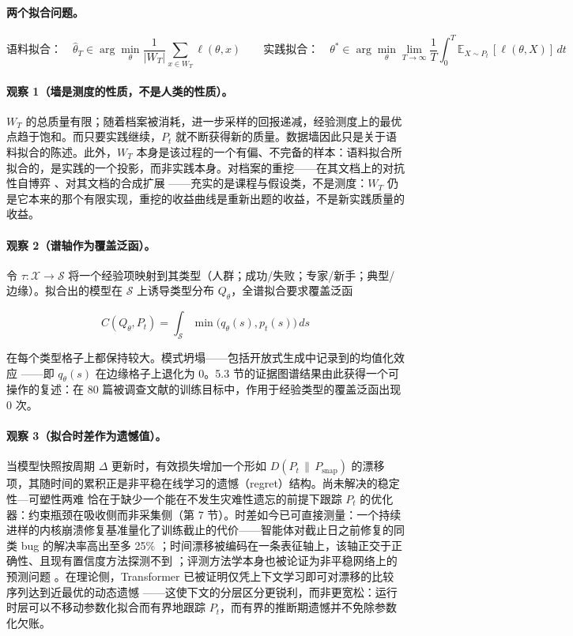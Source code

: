 \documentclass[10pt,fontset=fandol]{ctexart}
\begin{document}
\paragraph{两个拟合问题。}

\[\textbf{语料拟合：}\quad \hat{\theta}_T \in \arg\min_\theta \frac{1}{|W_T|}\sum_{x \in W_T} \ell(\theta, x) \qquad \textbf{实践拟合：}\quad \theta^* \in \arg\min_\theta \lim_{T\to\infty} \frac{1}{T}\int_0^T \mathbb{E}_{X \sim P_t}\,[\ell(\theta, X)]\, dt\]

\paragraph{观察 1（墙是测度的性质，不是人类的性质）。} $W_T$ 的总质量有限；随着档案被消耗，进一步采样的回报递减，经验测度上的最优点趋于饱和。而只要实践继续，$P_t$ 就不断获得新的质量。数据墙因此只是关于语料拟合的陈述。此外，$W_T$ 本身是该过程的一个有偏、不完备的样本：语料拟合所拟合的，是实践的一个投影，而非实践本身。对档案的重挖——在其文档上的对抗性自博弈 \cite{liu2025spice}、对其文档的合成扩展 \cite{kim2026megadocs}——充实的是课程与假设类，不是测度：$W_T$ 仍是它本来的那个有限实现，重挖的收益曲线是重新出题的收益，不是新实践质量的收益。

\paragraph{观察 2（谱轴作为覆盖泛函）。} 令 $\tau : \mathcal{X} \to \mathcal{S}$ 将一个经验项映射到其类型（人群；成功/失败；专家/新手；典型/边缘）。拟合出的模型在 $\mathcal{S}$ 上诱导类型分布 $Q_\theta$，全谱拟合要求覆盖泛函

\[C(Q_\theta, P_t) = \int_{\mathcal{S}} \min\big(q_\theta(s), p_t(s)\big)\, ds\]

在每个类型格子上都保持较大。模式坍塌——包括开放式生成中记录到的均值化效应 \cite{jiang2025hivemind}——即 $q_\theta(s)$ 在边缘格子上退化为 0。5.3 节的证据图谱结果由此获得一个可操作的复述：在 80 篇被调查文献的训练目标中，作用于经验类型的覆盖泛函出现 0 次。

\paragraph{观察 3（拟合时差作为遗憾值）。} 当模型快照按周期 $\Delta$ 更新时，有效损失增加一个形如 $D(P_t \,\|\, P_{\mathrm{snap}})$ 的漂移项，其随时间的累积正是非平稳在线学习的遗憾（regret）结构。尚未解决的稳定性—可塑性两难 \cite{wu2026agentdice} 恰在于缺少一个能在不发生灾难性遗忘的前提下跟踪 $P_t$ 的优化器：约束瓶颈在吸收侧而非采集侧（第 7 节）。时差如今已可直接测量：一个持续进样的内核崩溃修复基准量化了训练截止的代价——智能体对截止日之前修复的同类 bug 的解决率高出至多 25\% \cite{huang2026kernel}；时间漂移被编码在一条表征轴上，该轴正交于正确性、且现有置信度方法探测不到 \cite{elbadry2026geometry}；评测方法学本身也被论证为非平稳网络上的预测问题 \cite{thomas2026forecasting}。在理论侧，Transformer 已被证明仅凭上下文学习即可对漂移的比较序列达到近最优的动态遗憾 \cite{chen2025dynamicregret}——这使下文的分层区分更锐利，而非更宽松：运行时层可以不移动参数化拟合而有界地跟踪 $P_t$，而有界的推断期遗憾并不免除参数化欠账。
\end{document}
